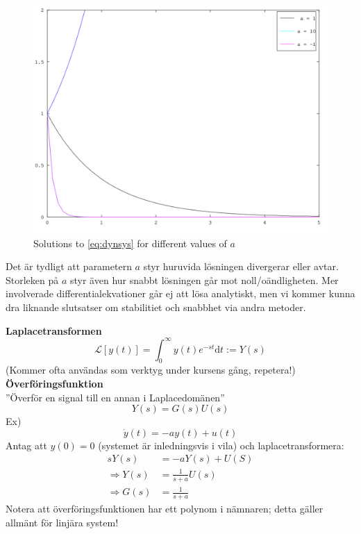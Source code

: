 \documentclass[12pt]{article}
\begin{document}
\begin{figure}[h!]
  \centering
  \includegraphics[width=\textwidth]{dynsys}
  \caption{Solutions to \eqref{eq:dynsys} for different values of $a$}
  \label{fig:dynsys}
\end{figure}
\FloatBarrier
Det är tydligt att parametern $a$ styr huruvida lösningen divergerar eller avtar. Storleken på $a$ styr även hur snabbt lösningen går mot noll/oändligheten. Mer involverade differentialekvationer går ej att lösa analytiskt, men vi kommer kunna dra liknande slutsatser om stabilitiet och snabbhet via andra metoder.

\textbf{Laplacetransformen}
\begin{equation*}
\mathcal{L}[y(t)] = \int_{0}^{\infty}y(t)e^{-st}\mathrm{d}t := Y(s)
\end{equation*}
(Kommer ofta användas som verktyg under kursens gång, repetera!) \\
\textbf{Överföringsfunktion} \\
''Överför en signal till en annan i Laplacedomänen'' \\
\begin{equation*}
  Y(s) = G(s)U(s)
\end{equation*}
Ex) \\
\begin{equation*}
  \dot{y}(t) = -ay(t) + u(t)
\end{equation*}
Antag att $y(0) = 0$ (systemet är inledningsvis i vila) och laplacetransformera:
\begin{align*}
  sY(s) &= -aY(s) + U(S) \\
\Rightarrow Y(s) &= \frac{1}{s+a}U(s) \\
\Rightarrow G(s) &= \frac{1}{s+a}
\end{align*}
Notera att överföringsfunktionen har ett polynom i nämnaren; detta gäller allmänt för linjära system!
\end{document}
